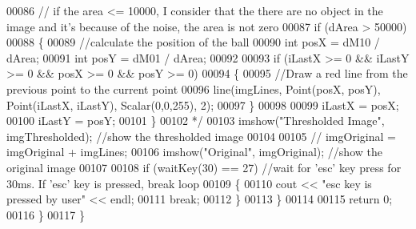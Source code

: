 \begin{DoxyCode}
00086 \textcolor{comment}{            // if the area <= 10000, I consider that the there are no object in the image and it's because
       of the noise, the area is not zero }
00087 \textcolor{comment}{            if (dArea > 50000)}
00088 \textcolor{comment}{            \{}
00089 \textcolor{comment}{            //calculate the position of the ball}
00090 \textcolor{comment}{            int posX = dM10 / dArea;}
00091 \textcolor{comment}{            int posY = dM01 / dArea;        }
00092 \textcolor{comment}{}
00093 \textcolor{comment}{            if (iLastX >= 0 && iLastY >= 0 && posX >= 0 && posY >= 0)}
00094 \textcolor{comment}{            \{}
00095 \textcolor{comment}{            //Draw a red line from the previous point to the current point}
00096 \textcolor{comment}{            line(imgLines, Point(posX, posY), Point(iLastX, iLastY), Scalar(0,0,255), 2);}
00097 \textcolor{comment}{            \}}
00098 \textcolor{comment}{}
00099 \textcolor{comment}{            iLastX = posX;}
00100 \textcolor{comment}{            iLastY = posY;}
00101 \textcolor{comment}{            \}}
00102 \textcolor{comment}{            */}
00103             imshow(\textcolor{stringliteral}{"Thresholded Image"}, imgThresholded); \textcolor{comment}{//show the thresholded image}
00104 
00105             \textcolor{comment}{//      imgOriginal = imgOriginal + imgLines;}
00106             imshow(\textcolor{stringliteral}{"Original"}, imgOriginal); \textcolor{comment}{//show the original image}
00107 
00108             \textcolor{keywordflow}{if} (waitKey(30) == 27) \textcolor{comment}{//wait for 'esc' key press for 30ms. If 'esc' key is pressed, break loop}
00109             \{
00110                 cout << \textcolor{stringliteral}{"esc key is pressed by user"} << endl;
00111                 \textcolor{keywordflow}{break}; 
00112             \}
00113         \}
00114 
00115         \textcolor{keywordflow}{return} 0;
00116     \}
00117 \}
\end{DoxyCode}
